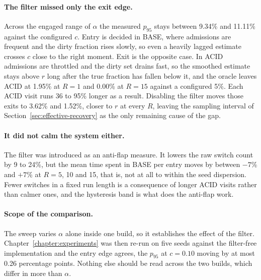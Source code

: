 \paragraph{The filter missed only the exit edge.} Across the engaged range
of $\alpha$ the measured $p_{95}$ stays between 9.34\% and 11.11\% against
the configured $c$. Entry is decided in BASE, where admissions are
frequent and the dirty fraction rises slowly, so even a heavily lagged
estimate crosses $c$ close to the right moment. Exit is the opposite case.
In ACID admissions are throttled and the dirty set drains fast, so the
smoothed estimate stays above $r$ long after the true fraction has fallen
below it, and the oracle leaves ACID at 1.95\% at $R = 1$ and 0.00\% at
$R = 15$ against a configured 5\%. Each ACID visit runs 36 to 95\% longer
as a result. Disabling the filter moves those exits to 3.62\% and 1.52\%,
closer to $r$ at every $R$, leaving the sampling interval of
Section~\ref{sec:effective-recovery} as the only remaining cause of the
gap.

\paragraph{It did not calm the system either.} The filter was introduced
as an anti-flap measure. It lowers the raw switch count by 9 to 24\%, but
the mean time spent in BASE per entry moves by between $-7$\% and $+7$\%
at $R = 5$, 10 and 15, that is, not at all to within the seed dispersion.
Fewer switches in a fixed run length is a consequence of longer ACID
visits rather than calmer ones, and the hysteresis band is what does the
anti-flap work.

\paragraph{Scope of the comparison.} The sweep varies $\alpha$ alone
inside one build, so it establishes the effect of the filter.
Chapter~\ref{chapter:experiments} was then re-run on five seeds against
the filter-free implementation and the entry edge agrees, the $p_{95}$ at
$c = 0.10$ moving by at most 0.26 percentage points. Nothing else should
be read across the two builds, which differ in more than $\alpha$.






